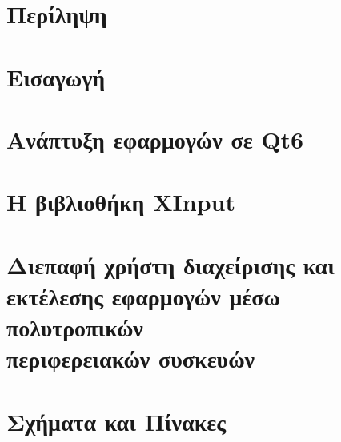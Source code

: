 \documentclass[a4paper,11pt,oneside,openany]{ioniothesis}
\begin{document}
\chapter*{Περίληψη} \pagestyle{headings}



\cleardoublepage

%


\cleardoublepage

\tableofcontents
\cleardoublepage




\listoffigures
\cleardoublepage
\listoftables

\setlength{\parskip}{5pt}



\pagestyle{headings}
\cleardoublepage


\newpage
{}


\cleardoublepage


\chapter{Εισαγωγή} \label{chapter:intro}


\chapter{Ανάπτυξη εφαρμογών σε Qt6} \label{chapter:qt6}


\chapter{Η βιβλιοθήκη XInput} \label{chapter:xinput}


\chapter{Διεπαφή χρήστη διαχείρισης και εκτέλεσης εφαρμογών μέσω πολυτροπικών \\
περιφερειακών συσκευών} \label{chapter:app}



\chapter{Σχήματα και Πίνακες} \label{chapter:sximata}

\end{document}
